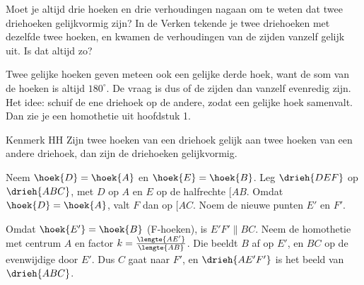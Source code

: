 Moet je altijd drie hoeken en drie verhoudingen nagaan om te weten dat twee driehoeken gelijkvormig zijn? In de Verken tekende je twee driehoeken met dezelfde twee hoeken, en kwamen de verhoudingen van de zijden vanzelf gelijk uit. Is dat altijd zo?

Twee gelijke hoeken geven meteen ook een gelijke derde hoek, want de som van de hoeken is altijd $180^\circ$. De vraag is dus of de zijden dan vanzelf evenredig zijn. Het idee: schuif de ene driehoek op de andere, zodat een gelijke hoek samenvalt. Dan zie je een homothetie uit hoofdstuk 1.

\begin{theorie}
\begin{minipage}[t]{.6\linewidth}
\vspace{0pt}
\begin{stelling}{Kenmerk HH}
Zijn twee hoeken van een driehoek gelijk aan twee hoeken van een andere driehoek, dan zijn de driehoeken gelijkvormig.
\end{stelling}

\begin{bewijs}
Neem $\hoek{D} = \hoek{A}$ en $\hoek{E} = \hoek{B}$. Leg $\drieh{DEF}$ op $\drieh{ABC}$, met $D$ op $A$ en $E$ op de halfrechte $[AB$. Omdat $\hoek{D} = \hoek{A}$, valt $F$ dan op $[AC$. Noem de nieuwe punten $E'$ en $F'$.

Omdat $\hoek{E'} = \hoek{B}$ (F-hoeken), is $E'F' \parallel BC$. Neem de homothetie met centrum $A$ en factor $k = \tfrac{\lengte{AE'}}{\lengte{AB}}$. Die beeldt $B$ af op $E'$, en $BC$ op de evenwijdige door $E'$. Dus $C$ gaat naar $F'$, en $\drieh{AE'F'}$ is het beeld van $\drieh{ABC}$.
\end{bewijs}
\end{minipage}\hfill
\begin{minipage}[t]{.36\linewidth}
\vspace{0pt}
\centering
{}
\end{minipage}
\end{theorie}

